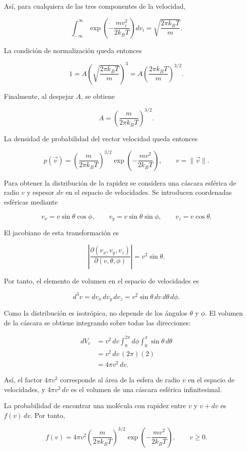 Así, para cualquiera de las tres componentes de la velocidad,

$$
\int_{-\infty}^{\infty}
\exp\left(-\frac{mv_i^2}{2k_BT}\right)dv_i
=\sqrt{\frac{2\pi k_BT}{m}}.
$$

La condición de normalización queda entonces

$$
1
=A\left(\sqrt{\frac{2\pi k_BT}{m}}\right)^3
=A\left(\frac{2\pi k_BT}{m}\right)^{3/2}.
$$

Finalmente, al despejar $A$, se obtiene

$$
\boxed{
A=\left(\frac{m}{2\pi k_BT}\right)^{3/2}
}.
$$

La densidad de probabilidad del vector velocidad queda entonces

$$
p(\vec{v})
=\left(\frac{m}{2\pi k_BT}\right)^{3/2}
\exp\left(-\frac{mv^2}{2k_BT}\right),
\qquad v=\lVert\vec{v}\rVert.
$$

Para obtener la distribución de la rapidez se considera una cáscara esférica
de radio $v$ y espesor $dv$ en el espacio de velocidades. Se introducen
coordenadas esféricas mediante

$$
v_x=v\sin\theta\cos\phi,
\qquad
v_y=v\sin\theta\sin\phi,
\qquad
v_z=v\cos\theta.
$$

El jacobiano de esta transformación es

$$
\left|
\frac{\partial(v_x,v_y,v_z)}
{\partial(v,\theta,\phi)}
\right|
=v^2\sin\theta.
$$

Por tanto, el elemento de volumen en el espacio de velocidades es

$$
d^3v
=dv_x\,dv_y\,dv_z
=v^2\sin\theta\,dv\,d\theta\,d\phi.
$$

Como la distribución es isotrópica, no depende de los ángulos $\theta$ y
$\phi$. El volumen de la cáscara se obtiene integrando sobre todas las
direcciones:

$$
\begin{aligned}
dV_v
&=v^2\,dv
\int_0^{2\pi}d\phi
\int_0^{\pi}\sin\theta\,d\theta\\
&=v^2\,dv\,(2\pi)(2)\\
&=4\pi v^2\,dv.
\end{aligned}
$$

Así, el factor $4\pi v^2$ corresponde al área de la esfera de radio $v$ en
el espacio de velocidades, y $4\pi v^2\,dv$ es el volumen de una cáscara
esférica infinitesimal.

La probabilidad de encontrar una molécula con rapidez entre $v$ y $v+dv$ es
$f(v)\,dv$. Por tanto,

$$
\boxed{
f(v)=4\pi v^2
\left(\frac{m}{2\pi k_BT}\right)^{3/2}
\exp\left(-\frac{mv^2}{2k_BT}\right)
},
\qquad v\geq0.
$$

